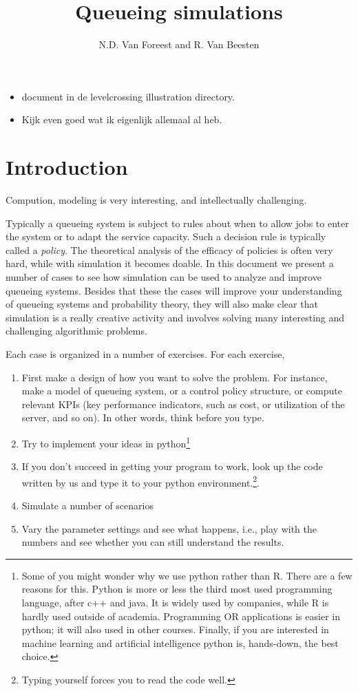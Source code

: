 \documentclass{scrartcl}
\title{Queueing simulations}
\author{N.D. Van Foreest and R. Van Beesten}
\begin{document}
\maketitle

\begin{itemize}
\item document in de levelcrossing illustration directory. 
\item Kijk even goed wat ik eigenlijk allemaal al heb.
\end{itemize}

\section{Introduction}

Compution, modeling is very interesting, and intellectually challenging. 


Typically a queueing system is subject to rules about when to allow jobs to enter the system or to adapt the service capacity. Such a decision rule is typically called a \emph{policy}.  The theoretical analysis of the efficacy of policies is often very hard, while with simulation it becomes doable.  In this document we present a number of cases to see how simulation can be used to analyze and improve queueing systems. Besides that these the cases will improve your understanding of queueing systems and probability theory, they will also make clear  that simulation is a really creative activity and involves solving many interesting and challenging  algorithmic problems.  


Each case is organized in a number of exercises. For each exercise,
\begin{enumerate}
\item First make a design of how you want to solve the problem. For instance, make a model of  queueing system, or a control policy structure, or compute relevant KPIs (key performance indicators, such as cost, or utilization of the server, and so on). In other words, think before you type. 
\item Try to implement your ideas in python\footnote{Some of you might wonder why we use python rather than R. There are a few reasons for this. Python is more or less the third most used programming language, after c++ and java. It is widely used by companies, while R is hardly  used outside of academia. Programming OR applications is easier in python; it will also used in other courses. Finally, if you are interested in machine learning and artificial intelligence python is, hands-down, the best choice.}
  \item If you don't succeed in getting your program to work,  look up the code written by us and type it to your python environment.\footnote{Typing yourself forces you to read the code well.}.
  \item Simulate a number of scenarios
  \item Vary the parameter settings and see what happens, i.e., play with the numbers and see whether you can still understand the results. 
\end{enumerate}
\end{document}
